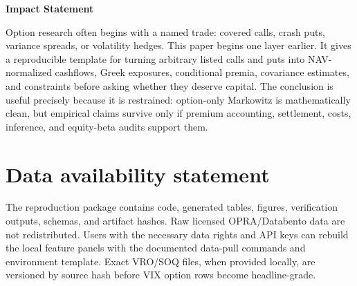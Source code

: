 \documentclass[11pt]{article}
\theoremstyle{definition}
\theoremstyle{remark}
\begin{document}
\vspace{0.28cm}
\noindent\colorbox{impactshade}{%
  \begin{minipage}{0.94\textwidth}
  \textbf{\color{journalgreen} Impact Statement}\par
  Option research often begins with a named trade: covered calls, crash puts, variance
  spreads, or volatility hedges. This paper begins one layer earlier. It gives a
  reproducible template for turning arbitrary listed calls and puts into NAV-normalized
  cashflows, Greek exposures, conditional premia, covariance estimates, and constraints
  before asking whether they deserve capital. The conclusion is useful precisely because it
  is restrained: option-only Markowitz is mathematically clean, but empirical claims survive
  only if premium accounting, settlement, costs, inference, and equity-beta audits support
  them.
  \end{minipage}}

\vspace{0.45cm}









\section*{Data availability statement}
The reproduction package contains code, generated tables, figures, verification outputs,
schemas, and artifact hashes. Raw licensed OPRA/Databento data are not redistributed.
Users with the necessary data rights and API keys can rebuild the local feature panels with
the documented data-pull commands and environment template. Exact VRO/SOQ files, when
provided locally, are versioned by source hash before VIX option rows become
headline-grade.




\clearpage
\appendix
\renewcommand{\thesection}{\Alph{section}}
\renewcommand{\thesubsection}{\thesection.\arabic{subsection}}

\end{document}
